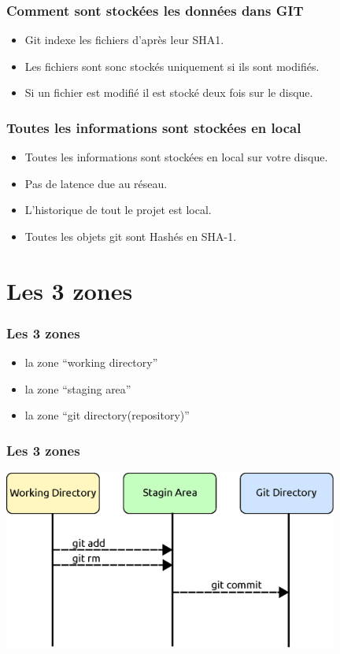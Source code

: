 \documentclass{beamer}
\begin{document}
    \begin{frame}
      \frametitle{Comment sont stockées les données dans GIT}
      \begin{itemize}
      \item Git indexe les fichiers d'après leur SHA1.
      \item Les fichiers sont sonc stockés uniquement si ils sont modifiés.
      \item Si un fichier est modifié il est stocké deux fois sur le disque.
      \end{itemize}
    \end{frame}

   \begin{frame}
      \frametitle{Toutes les informations sont stockées en local}
      \begin{itemize}
        \item Toutes les informations sont stockées en local sur votre disque.
        \item Pas de latence due au réseau.
        \item L'historique de tout le projet est local.
        \item Toutes les objets git sont Hashés en SHA-1.
      \end{itemize}
    \end{frame}
   \section{Les 3 zones}

   \begin{frame}
     \frametitle{Les 3 zones}
     \begin{itemize}
     \item la zone ``working directory''
     \item la zone ``staging area''
     \item la zone ``git directory(repository)''
     \end{itemize}
   \end{frame}

  \begin{frame}
     \frametitle{Les 3 zones}
     \begin{center}
       \includegraphics[width=11cm]{imgs/3zones.eps}
     \end{center}
  \end{frame}
\end{document}
